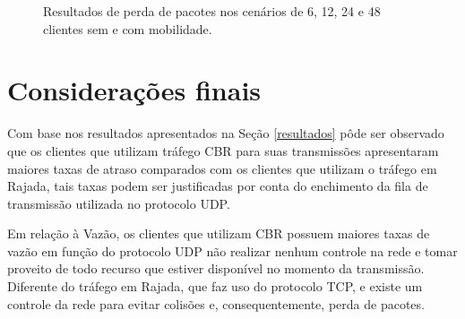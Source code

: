 \documentclass[12pt]{article}
\begin{document}
\begin{figure}[!ht]
	\centering
	\caption{Resultados de perda de pacotes nos cenários de 6, 12, 24 e 48 clientes sem e com mobilidade.}
	\label{fig:perda_extra_perc}
\end{figure}


\section{Considerações finais}
\label{consideracoes}

Com base nos resultados apresentados na Seção \ref{resultados} pôde ser observado que os clientes que utilizam tráfego CBR para suas transmissões apresentaram maiores taxas de atraso comparados com os clientes que utilizam o tráfego em Rajada, tais taxas podem ser justificadas por conta do enchimento da fila de transmissão utilizada no protocolo UDP.

Em relação à Vazão, os clientes que utilizam CBR possuem maiores taxas de vazão em função do protocolo UDP não realizar nenhum controle na rede e tomar proveito de todo recurso que estiver disponível no momento da transmissão. Diferente do tráfego em Rajada, que faz uso do protocolo TCP, e existe um controle da rede para evitar colisões e, consequentemente, perda de pacotes.
\end{document}
